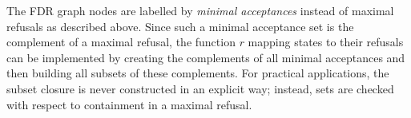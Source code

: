 The FDR graph nodes are labelled by \emph{minimal acceptances} instead of
maximal refusals as described above. Since such a minimal acceptance set is
the complement of a maximal refusal, the function $r$ mapping states to their
refusals can be implemented by creating the complements of all minimal
acceptances and then building all subsets of these complements. For practical
applications, the subset closure is never constructed in an explicit way;
instead, sets are checked with respect to containment in a maximal refusal.

%

 